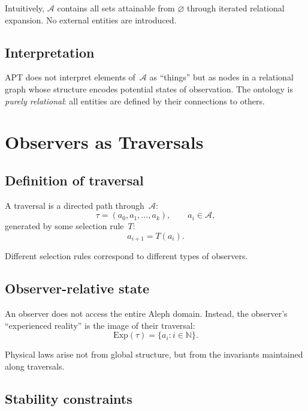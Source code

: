 \documentclass[12pt]{article}
\begin{document}
Intuitively, $\mathcal{A}$ contains all sets attainable from 
$\varnothing$ through iterated relational expansion.
No external entities are introduced.

\subsection{Interpretation}

APT does not interpret elements of~$\mathcal{A}$ as ``things'' but as
nodes in a relational graph whose structure encodes potential states of
observation.
The ontology is \emph{purely relational}:
all entities are defined by their connections to others.

\section{Observers as Traversals}

\subsection{Definition of traversal}

A traversal is a directed path through~$\mathcal{A}$:
\begin{equation}
\tau = (a_0, a_1, \dots, a_k),
\qquad
a_i \in \mathcal{A},
\end{equation}
generated by some selection rule~$T$:
\begin{equation}
a_{i+1} = T(a_i).
\end{equation}

Different selection rules correspond to different types of observers.

\subsection{Observer-relative state}

An observer does not access the entire Aleph domain.
Instead, the observer's ``experienced reality'' is the image of their 
traversal:
\begin{equation}
\mathrm{Exp}(\tau) = \{ a_i : i \in \mathbb{N} \}.
\end{equation}

Physical laws arise not from global structure, but from the invariants
maintained along traversals.

\subsection{Stability constraints}
\end{document}
